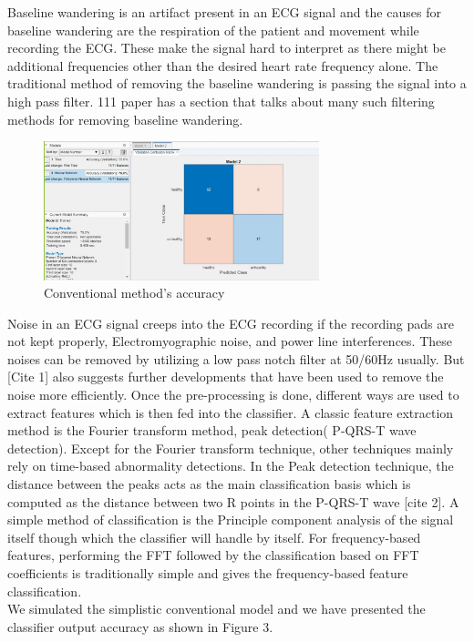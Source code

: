 \documentclass[10pt,twocolumn,letterpaper]{article}
\begin{document}
Baseline wandering is an artifact present in an ECG signal and the causes for baseline wandering are the respiration of the patient and movement while recording the ECG. These make the signal hard to interpret as there might be additional frequencies other than the desired heart rate frequency alone. The traditional method of removing the baseline wandering is passing the signal into a high pass filter. 111 paper has a section that talks about many such filtering methods for removing baseline wandering.\\
\begin{figure}[htbp]
\includegraphics[width=8cm]{ConventionalResult.jpg}
\caption{Conventional method's accuracy}
\label{Classification using conventional approach}
\end{figure}
Noise in an ECG signal creeps into the ECG recording if the recording pads are not kept properly, Electromyographic noise, and power line interferences. These noises can be removed by utilizing a low pass notch filter at 50/60Hz usually.  But [Cite 1] also suggests further developments that have been used to remove the noise more efficiently.
Once the pre-processing is done, different ways are used to extract features which is then fed into the classifier. A classic feature extraction method is the Fourier transform method, peak detection( P-QRS-T wave detection). Except for the Fourier transform technique, other techniques mainly rely on time-based abnormality detections.  In the Peak detection technique, the distance between the peaks acts as the main classification basis which is computed as the distance between two R points in the P-QRS-T wave [cite 2]. A simple method of classification is the Principle component analysis of the signal itself though which the classifier will handle by itself. For frequency-based features, performing the FFT followed by the classification based on FFT coefficients is traditionally simple and gives the frequency-based feature classification.\\
We simulated the simplistic conventional model and we have presented the classifier output accuracy as shown in Figure 3.
 
\end{document}
